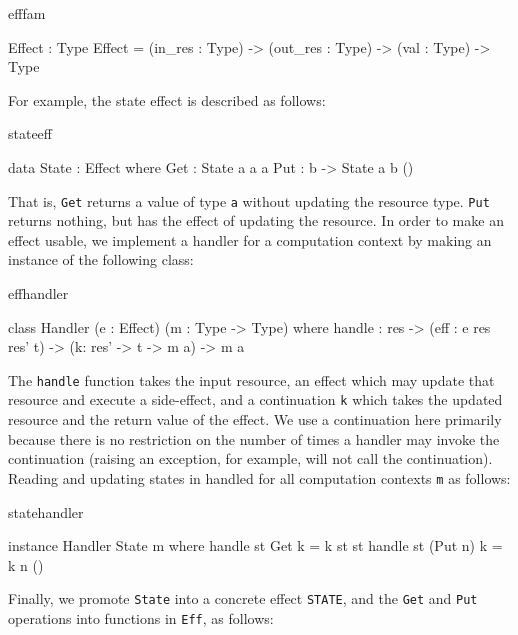 \begin{SaveVerbatim}{efffam}

Effect : Type
Effect = (in_res : Type) -> (out_res : Type) -> 
         (val : Type) -> Type

\end{SaveVerbatim}

\noindent
For example, the state effect is described as follows:

\begin{SaveVerbatim}{stateeff}

data State : Effect where
     Get :      State a a a
     Put : b -> State a b ()

\end{SaveVerbatim}

\noindent
That is, \texttt{Get} returns a value of type \texttt{a} without updating
the resource type. \texttt{Put} returns nothing, but has the effect of updating
the resource. In order to make an effect usable, we implement a handler
for a computation context by making an instance of the following class:

\begin{SaveVerbatim}{effhandler}

class Handler (e : Effect) (m : Type -> Type) where
     handle : res -> 
              (eff : e res res' t) -> 
              (k: res' -> t -> m a) -> m a

\end{SaveVerbatim}

\noindent
The \texttt{handle} function takes the input resource, an effect which may
update that resource and execute a side-effect, and a continuation \texttt{k}
which takes the updated resource and the return value of the effect. We use
a continuation here primarily because there is no restriction on the number of
times a handler may invoke the continuation (raising an exception, for example,
will not call the continuation). Reading and updating states in handled
for all computation contexts \texttt{m} as follows:

\begin{SaveVerbatim}{statehandler}

instance Handler State m where
     handle st Get     k = k st st
     handle st (Put n) k = k n ()

\end{SaveVerbatim}

\noindent
Finally, we promote \texttt{State} into a concrete effect \texttt{STATE}, and
the \texttt{Get} and \texttt{Put} operations into functions in \texttt{Eff}, as
follows:

